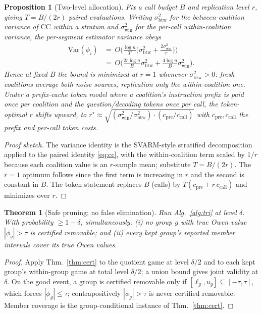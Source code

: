 \documentclass[10pt,twocolumn,letterpaper]{article}
\theoremstyle{plain}
\newtheorem{theorem}{Theorem}
\newtheorem{proposition}{Proposition}
\theoremstyle{definition}
\newcommand{\shap}{\phi}
\newcommand{\cc}{\mathrm{CC}}
\begin{document}
\begin{proposition}[Two-level allocation]
\label{prop:alloc}
Fix a call budget $B$ and replication level $r$, giving $T=B/(2r)$ paired
evaluations. Writing $\sigma^2_{\mathrm{btw}}$ for the between-coalition
variance of $\cc$ within a stratum and $\sigma^2_{\mathrm{win}}$ for the
per-call within-coalition variance, the per-segment estimator variance obeys
\begin{align*}
\mathrm{Var}(\shap_i)
&=\ O\!\Big(\tfrac{\log n}{T}\big(\sigma^2_{\mathrm{btw}}
+\tfrac{2\sigma^2_{\mathrm{win}}}{r}\big)\Big)\\
&=\ O\!\Big(\tfrac{2r\log n}{B}\sigma^2_{\mathrm{btw}}
+\tfrac{4\log n}{B}\sigma^2_{\mathrm{win}}\Big).
\end{align*}
Hence at fixed $B$ the bound is minimized at $r=1$ whenever
$\sigma^2_{\mathrm{btw}}>0$: fresh coalitions average both noise sources,
replication only the within-coalition one. Under a prefix-cache token model
where a coalition's instruction prefix is paid once per coalition and the
question/decoding tokens once per call, the token-optimal $r$ shifts upward, to
$r^\star\!\approx\!\sqrt{(\sigma^2_{\mathrm{win}}/\sigma^2_{\mathrm{btw}})\cdot
(c_{\mathrm{pre}}/c_{\mathrm{call}})}$ with $c_{\mathrm{pre}},c_{\mathrm{call}}$
the prefix and per-call token costs.
\end{proposition}
\begin{proof}[Proof sketch]
The variance identity is the SVARM-style stratified decomposition applied to the
paired identity \eqref{eq:cc}, with the within-coalition term scaled by $1/r$
because each coalition value is an $r$-sample mean; substitute $T=B/(2r)$. The
$r=1$ optimum follows since the first term is increasing in $r$ and the second is
constant in $B$. The token statement replaces $B$ (calls) by
$T(c_{\mathrm{pre}}+r\,c_{\mathrm{call}})$ and minimizes over $r$.
\end{proof}

\begin{theorem}[Safe pruning: no false elimination]
\label{thm:safe}
Run Alg.~\ref{alg:tri} at level $\delta$. With probability $\ge1-\delta$,
simultaneously: (i) no group $g$ with true Owen value $|\shap_g|>\tau$ is
certified removable; and (ii) every kept group's reported member intervals
cover its true Owen values.
\end{theorem}
\begin{proof}
Apply Thm.~\ref{thm:cert} to the quotient game at level $\delta/2$ and to each
kept group's within-group game at total level $\delta/2$; a union bound gives
joint validity at $\delta$. On the good event, a group is certified removable
only if $[\ell_g,u_g]\subseteq[-\tau,\tau]$, which forces $|\shap_g|\le\tau$;
contrapositively $|\shap_g|>\tau$ is never certified removable. Member coverage
is the group-conditional instance of Thm.~\ref{thm:cert}.
\end{proof}
\end{document}
